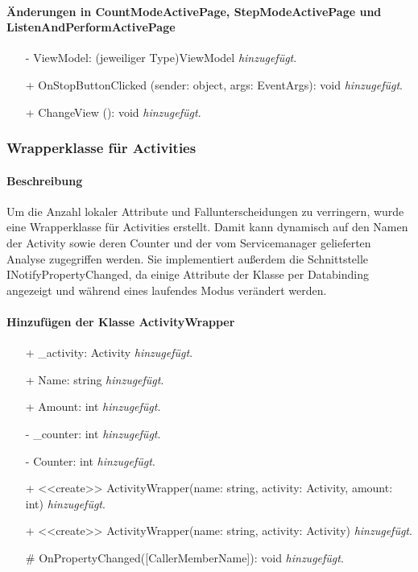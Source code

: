 \documentclass[a4paper,12pt]{article}
\begin{document}
\paragraph{Änderungen in CountModeActivePage, StepModeActivePage und ListenAndPerformActivePage}
\begin{itemize}
	\item[-] ViewModel: (jeweiliger Type)ViewModel \textit{hinzugefügt}.
	\item[+] OnStopButtonClicked (sender: object, args: EventArgs): void \textit{hinzugefügt}.
	\item[+] ChangeView (): void \textit{hinzugefügt}.
\end{itemize}

\subsubsection{Wrapperklasse für Activities}
\paragraph{Beschreibung}
Um die Anzahl lokaler Attribute und Fallunterscheidungen zu verringern, wurde eine Wrapperklasse für Activities  erstellt. Damit kann dynamisch auf den Namen der Activity sowie deren Counter und der vom Servicemanager gelieferten Analyse zugegriffen werden. Sie implementiert außerdem die Schnittstelle INotifyPropertyChanged, da einige Attribute der Klasse per Databinding angezeigt und während eines laufendes Modus verändert werden.
\paragraph{Hinzufügen der Klasse ActivityWrapper}
\begin{itemize}
	\item[+] \_activity: Activity \textit{hinzugefügt}.
	\item[+] Name: string \textit{hinzugefügt}.
	\item[+] Amount: int \textit{hinzugefügt}.
	\item[-] \_counter: int \textit{hinzugefügt}.
	\item[-] Counter: int \textit{hinzugefügt}.
	\item[+] <<create>> ActivityWrapper(name: string, activity: Activity, amount: int) \textit{hinzugefügt}.
	\item[+] <<create>> ActivityWrapper(name: string, activity: Activity) \textit{hinzugefügt}.
	\item[\#] OnPropertyChanged([CallerMemberName]): void \textit{hinzugefügt}.
\end{itemize}
\end{document}
